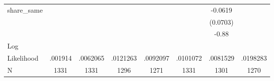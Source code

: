 {\begin{tabular}{l*{7}{c}}
share\_same  &               &               &               &               &               &     -0.0619   &               \\
            &               &               &               &               &               &    (0.0703)   &               \\
            &               &               &               &               &               &       -0.88   &               \\
\hline
Log         &               &               &               &               &               &               &               \\
Likelihood  &     .001914   &    .0062065   &    .0121263   &    .0092097   &    .0101072   &    .0081529   &    .0198283   \\
N           &        1331   &        1331   &        1296   &        1271   &        1331   &        1301   &        1270   \\
\hline\hline
\end{tabular}
}
